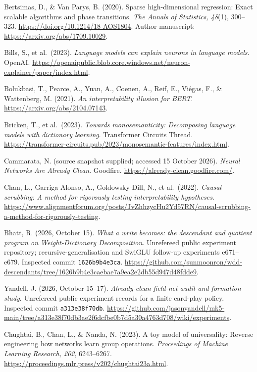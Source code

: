 \documentclass[
  british,
  11pt,
  a4paper,
]{article}
\begin{document}
Bertsimas, D., \& Van Parys, B. (2020). Sparse high-dimensional
regression: Exact scalable algorithms and phase transitions. \emph{The
Annals of Statistics, 48}(1), 300--323.
\url{https://doi.org/10.1214/18-AOS1804}. Author manuscript:
\url{https://arxiv.org/abs/1709.10029}.

Bills, S., et al.~(2023). \emph{Language models can explain neurons in
language models}. OpenAI.
\url{https://openaipublic.blob.core.windows.net/neuron-explainer/paper/index.html}.

Bolukbasi, T., Pearce, A., Yuan, A., Coenen, A., Reif, E., Viégas, F.,
\& Wattenberg, M. (2021). \emph{An interpretability illusion for BERT}.
\url{https://arxiv.org/abs/2104.07143}.

Bricken, T., et al.~(2023). \emph{Towards monosemanticity: Decomposing
language models with dictionary learning}. Transformer Circuits Thread.
\url{https://transformer-circuits.pub/2023/monosemantic-features/index.html}.

Cammarata, N. (source snapshot supplied; accessed 15 October 2026).
\emph{Neural Networks Are Already Clean}. Goodfire.
\url{https://already-clean.goodfire.com/}.

Chan, L., Garriga-Alonso, A., Goldowsky-Dill, N., et al.~(2022).
\emph{Causal scrubbing: A method for rigorously testing interpretability
hypotheses}.
\url{https://www.alignmentforum.org/posts/JvZhhzycHu2Yd57RN/causal-scrubbing-a-method-for-rigorously-testing}.

Bhatt, R. (2026, October 15). \emph{What a write becomes: the descendant
and quotient program on Weight-Dictionary Decomposition}. Unrefereed
public experiment repository; recursive-generalisation and SwiGLU
follow-up experiments e671--e679. Inspected commit
\texttt{1626b9b4e3ca}.
\url{https://github.com/sunmoonron/wdd-descendants/tree/1626b9b4e3caebae7a9ea2e2db55d947d48fdde9}.

Yandell, J. (2026, October 15--17). \emph{Already-clean field-net audit
and formation study}. Unrefereed public experiment records for a finite
card-play policy. Inspected commit \texttt{a313e38f70db}.
\url{https://github.com/jasonyandell/mk5-main/tree/a313e38f70db3ae2f6dcfbe0b7d5a30a4763d708/wiki/experiments}.

Chughtai, B., Chan, L., \& Nanda, N. (2023). A toy model of
universality: Reverse engineering how networks learn group operations.
\emph{Proceedings of Machine Learning Research, 202}, 6243--6267.
\url{https://proceedings.mlr.press/v202/chughtai23a.html}.
\end{document}
